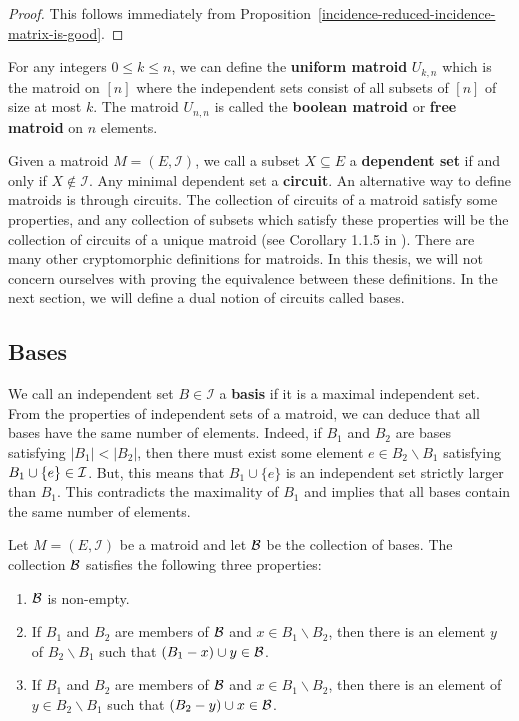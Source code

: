 \documentclass{puthesis-UG}
\begin{document}
\begin{proof}
	This follows immediately from Proposition~\ref{incidence-reduced-incidence-matrix-is-good}. 
\end{proof}

\begin{example}
	For any integers $0 \leq k \leq n$, we can define the \textbf{uniform matroid} $U_{k, n}$ which is the matroid on $[n]$ where the independent sets consist of all subsets of $[n]$ of size at most $k$. The matroid $U_{n, n}$ is called the \textbf{boolean matroid} or \textbf{free matroid} on $n$ elements. 
\end{example}


Given a matroid $M = (E, \mathcal{I})$, we call a subset $X \subseteq E$ a \textbf{dependent set} if and only if $X \notin \mathcal{I}$. Any minimal dependent set a \textbf{circuit}. An alternative way to define matroids is through circuits. The collection of circuits of a matroid satisfy some properties, and any collection of subsets which satisfy these properties will be the collection of circuits of a unique matroid (see Corollary 1.1.5 in \cite{10.5555/1197093}). There are many other cryptomorphic definitions for matroids. In this thesis, we will not concern ourselves with proving the equivalence between these definitions. In the next section, we will define a dual notion of circuits called bases.

\subsection{Bases} \label{sec:bases}

We call an independent set $B \in \mathcal{I}$ a \textbf{basis} if it is a maximal independent set. From the properties of independent sets of a matroid, we can deduce that all bases have the same number of elements. Indeed, if $B_1$ and $B_2$ are bases satisfying $|B_1| < |B_2|$, then there must exist some element $e \in B_2 \backslash B_1$ satisfying $B_1 \cup \{e\} \in \mathcal{I}$. But, this means that $B_1 \cup \{e\}$ is an independent set strictly larger than $B_1$. This contradicts the maximality of $B_1$ and implies that all bases contain the same number of elements. 

\begin{prop} \label{prop:matroid-bases}
	Let $M = (E, \mathcal{I})$ be a matroid and let $\mathcal{B}$ be the collection of bases. The collection $\mathcal{B}$ satisfies the following three properties:
	\begin{enumerate}[label = (\alph*)]
		\item $\mathcal{B}$ is non-empty.
		\item If $B_1$ and $B_2$ are members of $\mathcal{B}$ and $x \in B_1 \backslash B_2$, then there is an element $y$ of $B_2 \backslash B_1$ such that $(B_1 - x) \cup y \in \mathcal{B}$. 
		\item If $B_1$ and $B_2$ are members of $\mathcal{B}$ and $x \in B_1 \backslash B_2$, then there is an element of $y \in B_2 \backslash B_1$ such that $(B_2 - y) \cup x \in \mathcal{B}$. 
	\end{enumerate}
\end{prop}
\end{document}
